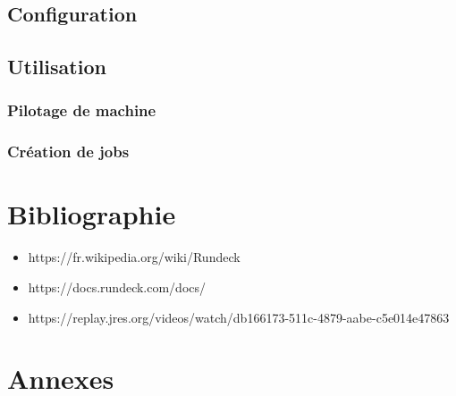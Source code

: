 \documentclass[11pt]{article}
\begin{document}
\subsection{Configuration}

\subsection{Utilisation}

\subsubsection{Pilotage de machine}

\subsubsection{Création de jobs}

\section{Bibliographie}
\begin{itemize}
    \item https://fr.wikipedia.org/wiki/Rundeck
    \item https://docs.rundeck.com/docs/
    \item {https://replay.jres.org/videos/watch/db166173-511c-4879-aabe-c5e014e47863}
\end{itemize}

\section{Annexes}
\end{document}
